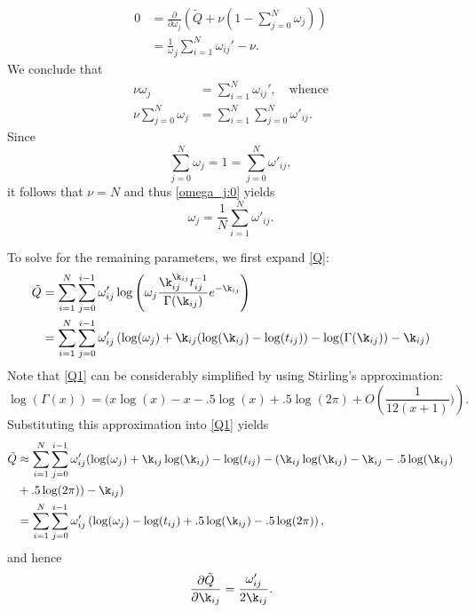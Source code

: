 \documentclass[12pt,leqno]{article}
\begin{document}
\begin{align*}
  0 &= \frac{\partial}{\partial\omega_j}\left(\tilde{Q} + \nu(1-\sum_{j=0}^N\omega_j )\right) \\
  &= \frac{1}\omega_j\sum_{i=1}^N\omega_{ij}' - \nu.
\end{align*}
We conclude that
\begin{equation}\label{omega_j:0}
  \begin{split}
  \nu\omega_j &= \sum_{i=1}^N\omega_{ij}',\quad\text{whence} \\
  \nu\sum_{j=0}^N\omega_j &= \sum_{i=1}^N\sum_{j=0}^N\omega'_{ij}.
  \end{split}
\end{equation}
Since
$$
\sum_{j=0}^N \omega_j = 1 = \sum_{j=0}^N\omega'_{ij},
$$
it follows that $\nu = N$ and thus \eqref{omega_j:0} yields
\begin{equation}\label{omega_j}
  \omega_j = \frac{1}{N}\sum_{i=1}^N\omega'_{ij}.
\end{equation}

To solve for the remaining parameters, we first expand \eqref{Q}:
\begin{equation}\label{Q1}
  \begin{split}
    \tilde{Q} &= \sum_{i=1}^N\sum_{j=0}^{i-1}\omega'_{ij}\log\left(\omega_j\frac{\k_{ij}^{\k_{ij}}t_{ij}^{-1}}
          {\Gamma(\k_{ij})}e^{-\k_{ij}} \right)\\
    &= \sum_{i=1}^N\sum_{j=0}^{i-1}\omega'_{ij}\left(\log(\omega_j)+\k_{ij}(\log(\k_{ij}) - \log(t_{ij})) 
          -\log(\Gamma(\k_{ij})) -\k_{ij}\right)\\
  \end{split}
\end{equation}
Note that \eqref{Q1} can be considerably simplified by using Stirling's approximation:
\begin{equation}\label{stirling}
  \log(\Gamma(x)) =  (x\log(x) -x - .5\log(x) + .5\log(2\pi) + O\left(\frac{1}{12(x+1)})\right).%
\end{equation}
Substituting this approximation into \eqref{Q1} yields
\begin{equation}\label{Q2}
  \begin{split}
    \tilde{Q} &\approx \sum_{i=1}^N\sum_{j=0}^{i-1}\omega'_{ij}(\log(\omega_j)+\k_{ij}\log(\k_{ij}) - \log(t_{ij})
    -(\k_{ij}\log(\k_{ij}) -\k_{ij} -.5\log(\k_{ij}) \\
    &+ .5\log(2\pi)) -\k_{ij})\\
  &= \sum_{i=1}^N\sum_{j=0}^{i-1}\omega'_{ij}\left(\log(\omega_j) - \log(t_{ij}) + .5\log(\k_{ij})
  - .5\log(2\pi) \right),
  \end{split}
\end{equation}
and hence
\begin{equation}\label{dQ_dk}
  \frac{\partial\tilde{Q}}{\partial\k_{ij}} = \frac{\omega'_{ij}}{2\k_{ij}}.
\end{equation}
\end{document}

